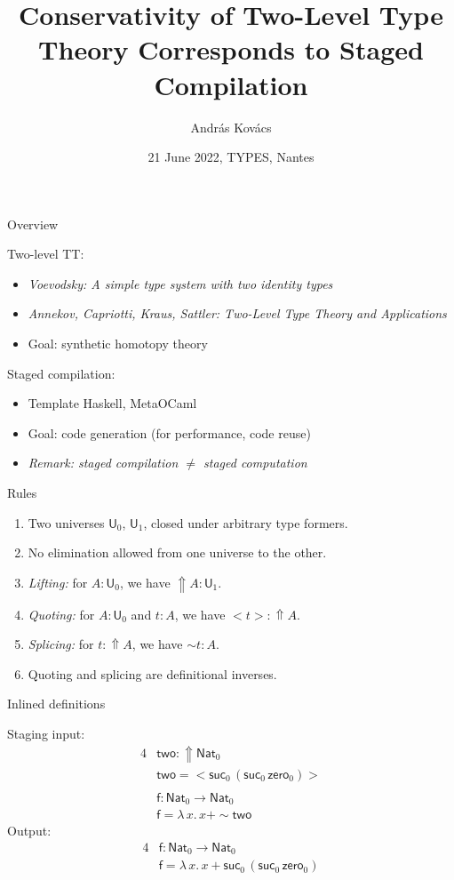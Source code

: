 \documentclass[dvipsnames]{beamer}
\title{Conservativity of Two-Level Type Theory Corresponds to Staged Compilation}
\author{András Kovács}
\institute{
  {Eötvös Loránd University}
}
\date{21 June 2022, TYPES, Nantes}
\newcommand{\msf}[1]{\mathsf{#1}}
\newcommand{\Lift}{{\Uparrow}}
\newcommand{\spl}{{\sim}}
\newcommand{\qut}[1]{{<}#1{>}}
\newcommand{\U}{\msf{U}}
\newcommand{\Nat}{\msf{Nat}}
\newcommand{\zero}{\msf{zero}}
\newcommand{\suc}{\msf{suc}}
\theoremstyle{remark}
\begin{document}
\frame{\titlepage}

\begin{frame}{Overview}

Two-level TT:
\begin{itemize}
  \item \emph{Voevodsky: A simple type system with two identity types}
  \item \emph{Annekov, Capriotti, Kraus, Sattler: Two-Level Type Theory and Applications}
  \item Goal: synthetic homotopy theory
\end{itemize}
\vspace{1em}
\pause

Staged compilation:
\begin{itemize}
  \item Template Haskell, MetaOCaml
  \item Goal: code generation (for performance, code reuse)
  \pause
  \item \emph{Remark: staged compilation $\neq$ staged computation}
\end{itemize}
\vspace{1em}

\end{frame}

\begin{frame}{Rules}

  \begin{enumerate}
    \item Two universes $\U_0$, $\U_1$, closed under arbitrary type formers.
    \pause
    \item No elimination allowed from one universe to the other.
    \pause
    \item \emph{Lifting:} for $A : \U_0$, we have $\Lift A : \U_1$.
    \pause
    \item \emph{Quoting:} for $A : \U_0$ and $t : A$, we have $\qut{t} : \Lift A$.
    \pause
    \item \emph{Splicing:} for $t : \Lift A$, we have $\spl{t} : A$.
    \pause
    \item Quoting and splicing are definitional inverses.
  \end{enumerate}

\end{frame}

\begin{frame}{Inlined definitions}

Staging input:
\begin{alignat*}{4}
  &\msf{two} : \Lift \Nat_0 \\
  &\msf{two} = \qut{\suc_0\,(\suc_0\,\zero_0)} \\
  & \\
  & \msf{f} : \Nat_0 \to \Nat_0 \\
  & \msf{f} = \lambda\,x.\, x + \spl{\msf{two}}
\end{alignat*}
\pause
Output:
\begin{alignat*}{4}
  & \msf{f} : \Nat_0 \to \Nat_0 \\
  & \msf{f} = \lambda\,x.\, x + \suc_0\,(\suc_0\,\zero_0)
\end{alignat*}


\end{frame}
\end{document}
